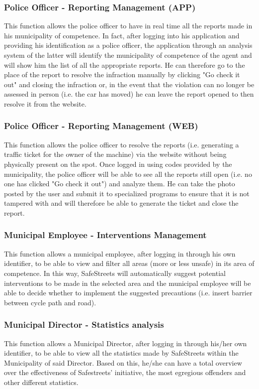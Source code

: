 \documentclass{article}
\begin{document}
    \subsubsection{Police Officer - Reporting Management (APP)}
    This function allows the police officer to have in real time all the reports
    made in his municipality of competence. In fact, after logging into his
    application and providing his identification as a police officer, the
    application through an analysis system of the latter will identify the
    municipality of competence of the agent and will show him the list of all
    the appropriate reports. He can therefore go to the place of the report to
    resolve the infraction manually by clicking "Go check it out" and closing the
    infraction or, in the event that the violation can no longer be assessed in
    person (i.e. the car has moved) he can leave the report opened to then
    resolve it from the website.

    \subsubsection{Police Officer - Reporting Management (WEB)}
    This function allows the police officer to resolve the reports (i.e.
    generating a traffic ticket for the owner of the machine) via the website
    without being physically present on the spot. Once logged in using codes
    provided by the municipality, the police officer will be able to see all the
    reports still open (i.e. no one has clicked "Go check it out") and analyze
    them. He can take the photo posted by the user and submit it to specialized
    programs to ensure that it is not tampered with and will therefore be able
    to generate the ticket and close the report.

    \subsubsection{Municipal Employee - Interventions Management}
    This function allows a municipal employee, after logging in through his own
    identifier, to be able to view and filter all areas (more or less unsafe) in
    its area of competence. In this way, SafeStreets will automatically suggest
    potential interventions to be made in the selected area and the municipal
    employee will be able to decide whether to implement the suggested
    precautions (i.e. insert barrier between cycle path and road).

    \subsubsection{Municipal Director - Statistics analysis}
    This function allows a Municipal Director, after logging in through his/her
    own identifier, to be able to view all the statistics made by SafeStreets
    within the Municipality of said Director. Based on this, he/she can have a
    total overview over the effectiveness of Safestreets' initiative, the most
    egregious offenders and other different statistics.
\end{document}
